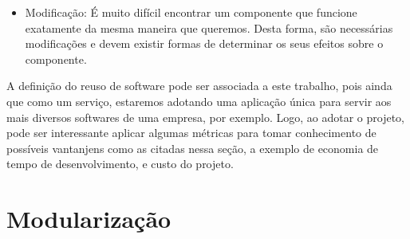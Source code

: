 \begin{itemize}
\item Modificação: É muito difícil encontrar um componente que funcione
exatamente da mesma maneira que queremos. Desta forma, são necessárias modificações e devem existir formas de determinar os seus efeitos sobre o componente.


\end{itemize}


A definição do reuso de software pode ser associada a este trabalho, pois ainda que como um serviço, estaremos adotando uma aplicação única para servir aos mais diversos softwares de uma empresa, por exemplo. Logo, ao adotar o projeto, pode ser interessante aplicar algumas métricas para tomar conhecimento de possíveis vantanjens como as citadas nessa seção, a exemplo de economia de tempo de desenvolvimento, e custo do projeto.




\section{Modularização}\label{sec:modularizacao} %





